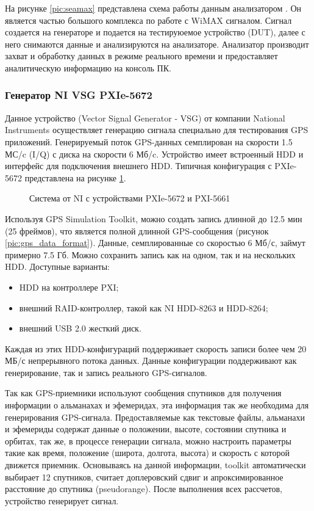 На рисунке \ref{pic:seamax} представлена схема работы данным анализатором \cite{seamax_pdf}. Он является частью большого комплекса по работе
с WiMAX сигналом. Сигнал создается на генераторе и подается на тестируюемое устройство (DUT), далее с него снимаются 
данные и анализируются на анализаторе. Анализатор производит захват и обработку данных в режиме реального времени и
предоставляет аналитическую информацию на консоль ПК.

\subsubsection{Генератор NI VSG PXIe-5672}
\label{sec:vsg}
Данное устройство (Vector Signal Generator - VSG) от компании National Instruments осуществляет генерацию сигнала специально для тестирования
GPS приложений. Генерируемый поток GPS-данных семплирован на скорости 1.5 МС/c (I/Q) с диска на скорости 6 Мб/c.
Устройство имеет встроенный HDD и интерфейс для подключения внешнего HDD. Типичная конфигурация с PXIe-5672
представлена на рисунке \ref{pic:ni_system}.

\begin{figure}[H]
\begin{center}
\end{center}
\caption{Система от NI с устройствами PXIe-5672 и PXI-5661}
\label{pic:ni_system}
\end{figure}

Используя GPS Simulation Toolkit, можно создать запись длинной до 12.5 мин (25 фреймов), что является полной длинной
GPS-сообщения \cite{yacenkov, tsui} (рисунок \ref{pic:gps_data_format}). Данные, семплированные со скоростью 6 Мб/с,
займут примерно 7.5 Гб. Можно сохранить запись как на одном, так и на нескольких HDD. Доступные варианты:
\begin{itemize}
\item HDD на контроллере PXI;
\item внешний RAID-контроллер, такой как NI HDD-8263 и HDD-8264;
\item внешний USB 2.0 жесткий диск.
\end{itemize}

Каждая из этих HDD-конфигураций поддерживает скорость записи более чем 20 МБ/с непрерывного потока данных.
Данные конфигурации поддерживают как генерирование, так и запись реального GPS-сигналов.

Так как GPS-приемники используют сообщения спутников для получения информации о альманахах и эфемеридах, эта информация
так же необходима для генерирования GPS-сигнала. Предоставляемые как текстовые файлы, альманахи и эфемериды содержат
данные о положении, высоте, состоянии спутника и орбитах, так же, в процессе генерации сигнала, можно настроить параметры
такие как время, положение (широта, долгота, высота) и скорость с которой движется приемник. Основываясь на данной
информации, toolkit автоматически выбирает 12 спутников, считает доплеровский сдвиг и апроксимированное расстояние до
спутника (pseudorange). После выполнения всех рассчетов, устройство генерирует сигнал.

